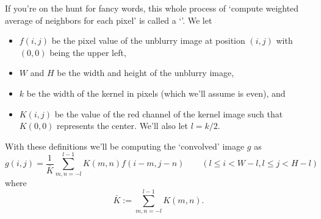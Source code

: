 \documentclass[11pt]{article}
\begin{document}
If you're on the hunt for fancy words, this whole process of `compute
weighted average of neighbors for each pixel' is called a
`'.
We let
\begin{itemize}
  \item $f(i,j)$ be the pixel value of the unblurry image at position $(i,j)$ with $(0,0)$
    being the upper left,
  \item $W$ and $H$ be the width and height of the unblurry image,
  \item $k$ be the width of the kernel in pixels (which
    we'll assume is even), and
  \item $K(i,j)$ be the value of the red channel of the
    kernel image such that $K(0,0)$ represents the center.
    We'll also let $l=k/2$.
\end{itemize}
With these definitions we'll be computing the `convolved' image $g$ as
\[
  g(i,j)=\frac{1}{\bar K} \sum_{m,n=-l}^{l-1} K(m,n)f(i-m,j-n)
  \qquad
  (l\le i <W-l,l\le j<H-l)
\]
where
\[
  \bar K:=\sum_{m,n=-l}^{l-1} K(m,n).
\]
\end{document}
